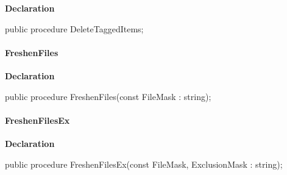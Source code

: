 \documentclass{report}
\newif\ifpdf
\begin{document}
\label{AbZipper.TAbCustomZipper-DeleteTaggedItems}
\begin{list}{}{
\setlength{\itemindent}{0cm}
\setlength{\listparindent}{0cm}
\setlength{\leftmargin}{\evensidemargin}
\addtolength{\leftmargin}{\tmplength}
\settowidth{\labelsep}{X}
\addtolength{\leftmargin}{\labelsep}
\setlength{\labelwidth}{\tmplength}
}
\item[\textbf{Declaration}\hfill]
\ifpdf
\begin{flushleft}
\fi
\begin{ttfamily}
public procedure DeleteTaggedItems;\end{ttfamily}

\ifpdf
\end{flushleft}
\fi

\end{list}
\paragraph*{FreshenFiles}\hspace*{\fill}

\label{AbZipper.TAbCustomZipper-FreshenFiles}
\begin{list}{}{
\setlength{\itemindent}{0cm}
\setlength{\listparindent}{0cm}
\setlength{\leftmargin}{\evensidemargin}
\addtolength{\leftmargin}{\tmplength}
\settowidth{\labelsep}{X}
\addtolength{\leftmargin}{\labelsep}
\setlength{\labelwidth}{\tmplength}
}
\item[\textbf{Declaration}\hfill]
\ifpdf
\begin{flushleft}
\fi
\begin{ttfamily}
public procedure FreshenFiles(const FileMask : string);\end{ttfamily}

\ifpdf
\end{flushleft}
\fi

\end{list}
\paragraph*{FreshenFilesEx}\hspace*{\fill}

\label{AbZipper.TAbCustomZipper-FreshenFilesEx}
\begin{list}{}{
\setlength{\itemindent}{0cm}
\setlength{\listparindent}{0cm}
\setlength{\leftmargin}{\evensidemargin}
\addtolength{\leftmargin}{\tmplength}
\settowidth{\labelsep}{X}
\addtolength{\leftmargin}{\labelsep}
\setlength{\labelwidth}{\tmplength}
}
\item[\textbf{Declaration}\hfill]
\ifpdf
\begin{flushleft}
\fi
\begin{ttfamily}
public procedure FreshenFilesEx(const FileMask, ExclusionMask : string);\end{ttfamily}

\ifpdf
\end{flushleft}
\fi

\end{list}
\end{document}
